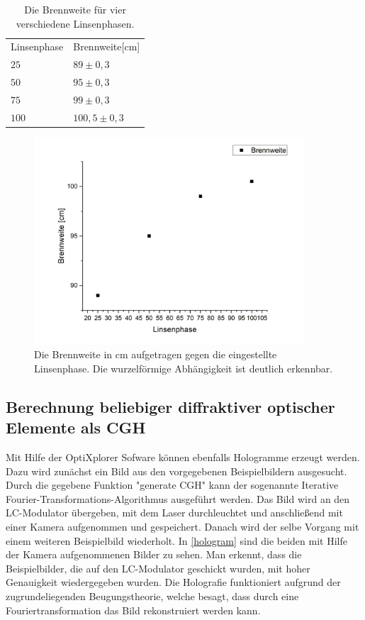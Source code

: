 \begin{table}[h]
	\caption{Die Brennweite für vier verschiedene Linsenphasen.}
	\begin{tabular}{ll}
		Linsenphase & Brennweite[cm]\\
		$25$ & $89\pm0,3$\\
		$50$ & $95\pm0,3$\\
		$75$ & $99\pm0,3$\\
		$100$ & $100,5\pm0,3$
	\end{tabular}
	\label{tab}
\end{table}

\begin{figure}
	\centering
	\includegraphics[width=0.9\textwidth]{linsenphase.png}
	\caption{Die Brennweite in cm aufgetragen gegen die eingestellte Linsenphase. Die wurzelförmige Abhängigkeit ist deutlich erkennbar.}
	\label{linsenphase}
\end{figure}

\subsection{Berechnung beliebiger diffraktiver optischer Elemente als CGH}
Mit Hilfe der OptiXplorer Sofware können ebenfalls Hologramme erzeugt werden. Dazu wird zunächst ein Bild aus den vorgegebenen Beispielbildern ausgesucht. Durch die gegebene Funktion "generate CGH" kann der sogenannte Iterative Fourier-Transformations-Algorithmus ausgeführt werden. Das Bild wird an den LC-Modulator übergeben, mit dem Laser durchleuchtet und anschließend mit einer Kamera aufgenommen und gespeichert. Danach wird der selbe Vorgang mit einem weiteren Beispielbild wiederholt. In  \cref{hologram} sind die beiden mit Hilfe der Kamera aufgenommenen Bilder zu sehen. Man erkennt, dass die Beispielbilder, die auf den LC-Modulator geschickt wurden, mit hoher Genauigkeit wiedergegeben wurden. Die Holografie funktioniert aufgrund der zugrundeliegenden Beugungstheorie, welche besagt, dass durch eine Fouriertransformation das Bild rekonstruiert werden kann.

